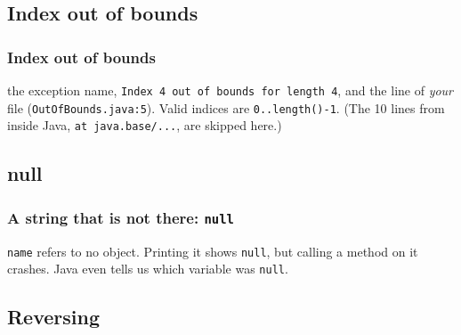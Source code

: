 \documentclass[aspectratio=169,10pt,compress]{beamer}
\begin{document}

\subsection[Index]{Index out of bounds}




\begin{frame}[t,fragile] \frametitle{Index out of bounds}

  \small {} the exception name, \texttt{Index 4 out of bounds for length 4}, and the
  line of \emph{your} file (\texttt{OutOfBounds.java:5}). Valid indices are \texttt{0..length()-1}.
  (The 10 lines from inside Java, \texttt{at java.base/...}, are skipped here.)
\end{frame}

\subsection[Null]{null}




\begin{frame}[t,fragile] \frametitle{A string that is not there: \texttt{null}}

  \small \texttt{name} refers to no object. Printing it shows \texttt{null}, but calling a method on it crashes.
  Java even tells us which variable was \texttt{null}.
\end{frame}





\subsection[Reverse]{Reversing}
\end{document}
